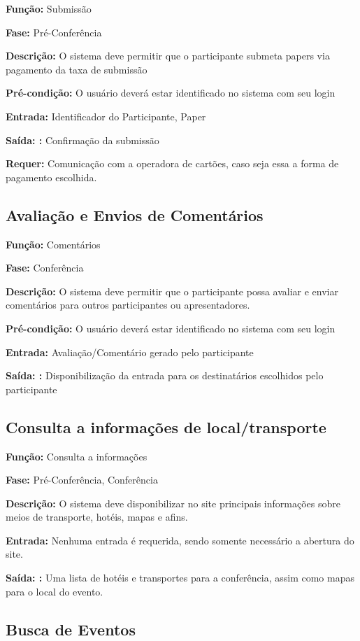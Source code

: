 \documentclass[letter]{article}
\begin{document}
\textbf{Função:} Submissão

\textbf{Fase: } Pré-Conferência

\textbf{Descrição: } O sistema deve permitir que o participante submeta papers via pagamento da taxa de submissão

\textbf{Pré-condição: } O usuário deverá estar identificado no sistema com seu login

\textbf{Entrada: } Identificador do Participante, Paper

\textbf{Saída: :} Confirmação da submissão

\textbf{Requer:} Comunicação com a operadora de cartões, caso seja essa a forma de pagamento escolhida.

\subsection{ Avaliação e Envios de Comentários}

\textbf{Função:} Comentários

\textbf{Fase: } Conferência

\textbf{Descrição: } O sistema deve permitir que o participante possa avaliar e enviar comentários para outros participantes ou apresentadores.

\textbf{Pré-condição: } O usuário deverá estar identificado no sistema com seu login

\textbf{Entrada: } Avaliação/Comentário gerado pelo participante

\textbf{Saída: :} Disponibilização da entrada para os destinatários escolhidos pelo participante


\subsection{ Consulta a informações de local/transporte}

\textbf{Função:} Consulta a informações

\textbf{Fase: } Pré-Conferência, Conferência

\textbf{Descrição: } O sistema deve disponibilizar no site principais informações sobre meios de transporte, hotéis, mapas e afins.

\textbf{Entrada: } Nenhuma entrada é requerida, sendo somente necessário a abertura do site.

\textbf{Saída: :} Uma lista de hotéis e transportes para a conferência, assim como mapas para o local do evento.


\subsection{ Busca de Eventos}
\end{document}
